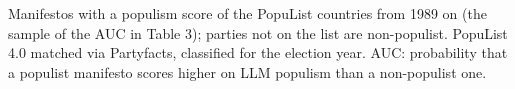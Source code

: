 \begin{table}[ht]
\caption{LLM populism by PopuList classification}
\label{tab:indep:popvalid}
\footnotesize
\centering
{}
\par\smallskip
\begin{minipage}{\linewidth}\scriptsize Manifestos with a populism score of the PopuList countries from 1989 on (the sample of the AUC in Table 3); parties not on the list are non-populist. PopuList 4.0 matched via Partyfacts, classified for the election year. AUC: probability that a populist manifesto scores higher on LLM populism than a non-populist one.\end{minipage}
\end{table}
